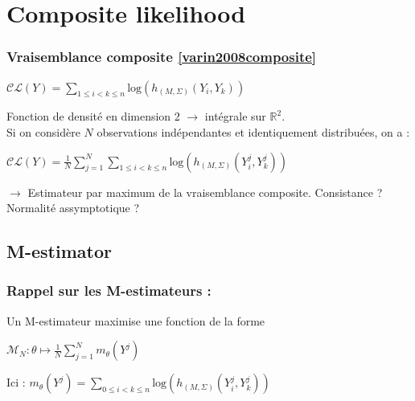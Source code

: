 \documentclass[11pt),table]{beamer}
\begin{document}
\section{Composite likelihood}

\begin{frame}
\frametitle{Vraisemblance composite \ref{varin2008composite}}
\begin{center}
$\mathcal{CL}(Y)= \sum_{1\leq i <k \leq n} \mathrm{log} (h_{(M,\Sigma)}(Y_i,Y_k))$
\end{center}
 Fonction de densité en dimension 2 $ \longrightarrow $ intégrale sur $\mathbb{R}^2$.\\
\vspace{0.5cm}
Si on considère $N$ observations indépendantes et identiquement distribuées, on a :
\begin{center}
$\mathcal{CL}(Y)= \frac{1}{N}\sum_{j=1}^N \sum_{1\leq i <k \leq n} \mathrm{log} (h_{(M,\Sigma)}(Y^j_i,Y^j_k))$
\end{center}

$\rightarrow$ Estimateur par maximum de la vraisemblance composite. Consistance ? Normalité assymptotique ?
\end{frame}
\subsection{M-estimator}
\begin{frame}
\frametitle{Rappel sur les M-estimateurs : }
Un M-estimateur maximise une fonction de la forme 
\begin{center}
$\mathcal{M}_N : \theta \mapsto \frac{1}{N} \sum_{j=1}^N m_\theta(Y^j)$
\end{center}
Ici :  $m_\theta(Y^j) = \sum_{0 \leq i < k \leq n} \mathrm{log} ( h_{(M,\Sigma)}(Y_i^j,Y_k^j) )$
\end{frame}
\end{document}
